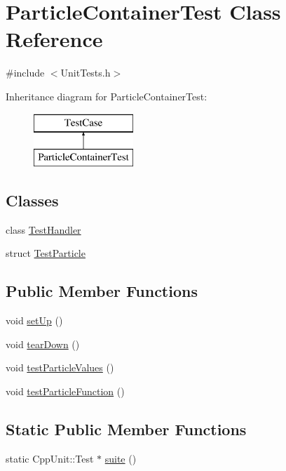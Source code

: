 \hypertarget{classParticleContainerTest}{\section{Particle\-Container\-Test Class Reference}
\label{classParticleContainerTest}
}


{\ttfamily \#include $<$Unit\-Tests.\-h$>$}

Inheritance diagram for Particle\-Container\-Test\-:\begin{figure}[H]
\begin{center}
\leavevmode
\includegraphics[height=2.000000cm]{classParticleContainerTest}
\end{center}
\end{figure}
\subsection*{Classes}
\begin{DoxyCompactItemize}
\item 
class \hyperlink{classParticleContainerTest_1_1TestHandler}{Test\-Handler}
\item 
struct \hyperlink{structParticleContainerTest_1_1TestParticle}{Test\-Particle}
\end{DoxyCompactItemize}
\subsection*{Public Member Functions}
\begin{DoxyCompactItemize}
\item 
void \hyperlink{classParticleContainerTest_a114674bf106f1237eb8e5d0afa2cead0}{set\-Up} ()
\item 
void \hyperlink{classParticleContainerTest_a3109d4eb4afad3ff4c046fc47ad4fcc4}{tear\-Down} ()
\item 
void \hyperlink{classParticleContainerTest_a60b5dc462c640e3d74a8805faf2b5bbc}{test\-Particle\-Values} ()
\item 
void \hyperlink{classParticleContainerTest_aa5ba7fed4e164c420346f1ddbed066d4}{test\-Particle\-Function} ()
\end{DoxyCompactItemize}
\subsection*{Static Public Member Functions}
\begin{DoxyCompactItemize}
\item 
static Cpp\-Unit\-::\-Test $\ast$ \hyperlink{classParticleContainerTest_a9d826385882d8383f9db17a8265032d3}{suite} ()
\end{DoxyCompactItemize}
